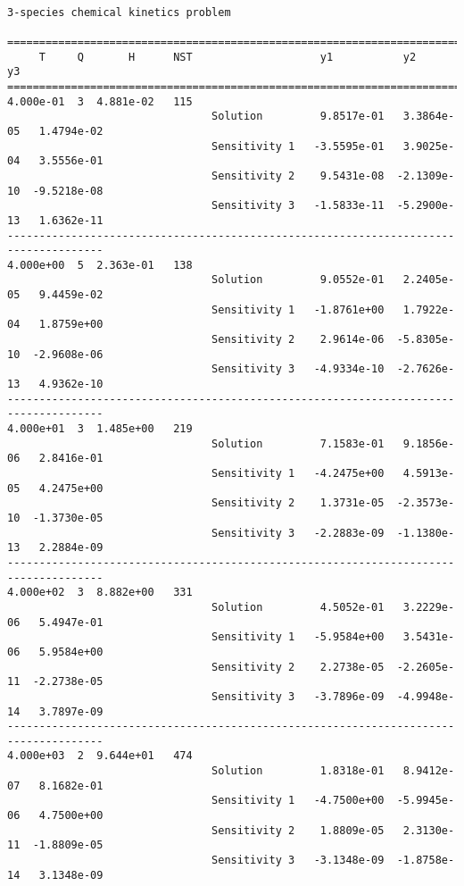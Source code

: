 \begin{verbatim}

3-species chemical kinetics problem

=====================================================================================
     T     Q       H      NST                    y1           y2           y3    
=====================================================================================
4.000e-01  3  4.881e-02   115
                                Solution         9.8517e-01   3.3864e-05   1.4794e-02 
                                Sensitivity 1   -3.5595e-01   3.9025e-04   3.5556e-01 
                                Sensitivity 2    9.5431e-08  -2.1309e-10  -9.5218e-08 
                                Sensitivity 3   -1.5833e-11  -5.2900e-13   1.6362e-11 
-------------------------------------------------------------------------------------
4.000e+00  5  2.363e-01   138
                                Solution         9.0552e-01   2.2405e-05   9.4459e-02 
                                Sensitivity 1   -1.8761e+00   1.7922e-04   1.8759e+00 
                                Sensitivity 2    2.9614e-06  -5.8305e-10  -2.9608e-06 
                                Sensitivity 3   -4.9334e-10  -2.7626e-13   4.9362e-10 
-------------------------------------------------------------------------------------
4.000e+01  3  1.485e+00   219
                                Solution         7.1583e-01   9.1856e-06   2.8416e-01 
                                Sensitivity 1   -4.2475e+00   4.5913e-05   4.2475e+00 
                                Sensitivity 2    1.3731e-05  -2.3573e-10  -1.3730e-05 
                                Sensitivity 3   -2.2883e-09  -1.1380e-13   2.2884e-09 
-------------------------------------------------------------------------------------
4.000e+02  3  8.882e+00   331
                                Solution         4.5052e-01   3.2229e-06   5.4947e-01 
                                Sensitivity 1   -5.9584e+00   3.5431e-06   5.9584e+00 
                                Sensitivity 2    2.2738e-05  -2.2605e-11  -2.2738e-05 
                                Sensitivity 3   -3.7896e-09  -4.9948e-14   3.7897e-09 
-------------------------------------------------------------------------------------
4.000e+03  2  9.644e+01   474
                                Solution         1.8318e-01   8.9412e-07   8.1682e-01 
                                Sensitivity 1   -4.7500e+00  -5.9945e-06   4.7500e+00 
                                Sensitivity 2    1.8809e-05   2.3130e-11  -1.8809e-05 
                                Sensitivity 3   -3.1348e-09  -1.8758e-14   3.1348e-09 

\end{verbatim}
